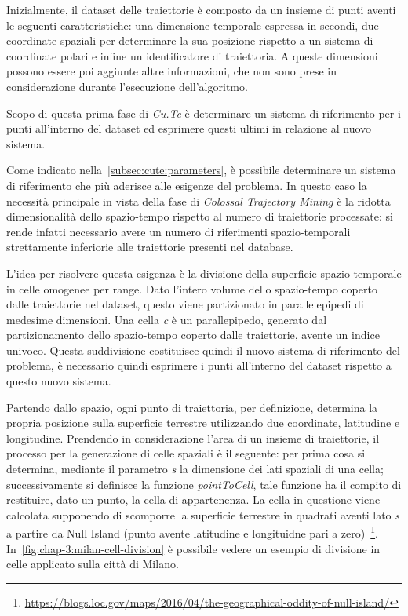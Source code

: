 Inizialmente, il dataset delle traiettorie è composto da un insieme di punti aventi le seguenti caratteristiche:
una dimensione temporale espressa in secondi, due coordinate spaziali per determinare la sua posizione rispetto a un sistema di coordinate polari e
infine un identificatore di traiettoria. A queste dimensioni possono essere poi aggiunte altre informazioni, che non sono prese in considerazione durante l'esecuzione dell'algoritmo.

Scopo di questa prima fase di \textit{Cu.Te} è determinare un sistema di riferimento per i punti all'interno del dataset ed esprimere questi ultimi in
relazione al nuovo sistema.

Come indicato nella~\cref{subsec:cute:parameters}, è possibile determinare un sistema di riferimento che più aderisce alle esigenze del problema.
In questo caso la necessità principale in vista della fase di \textit{Colossal Trajectory Mining} è la ridotta dimensionalità dello spazio-tempo rispetto al numero di traiettorie
processate: si rende infatti necessario avere un numero di riferimenti spazio-temporali strettamente inferiorie alle traiettorie presenti nel database.

L'idea per risolvere questa esigenza è la divisione della superficie spazio-temporale in celle omogenee per range. Dato l'intero volume dello spazio-tempo
coperto dalle traiettorie nel dataset, questo viene partizionato in parallelepipedi di medesime dimensioni. Una cella \textit{c} è un parallepipedo, generato dal
partizionamento dello spazio-tempo coperto dalle traiettorie, avente un indice univoco.
Questa suddivisione costituisce quindi il nuovo sistema di riferimento del problema, è necessario quindi esprimere i punti all'interno del dataset rispetto a questo nuovo sistema.

Partendo dallo spazio, ogni punto di traiettoria, per definizione, determina la propria posizione sulla superficie terrestre utilizzando due coordinate, latitudine e longitudine.
Prendendo in considerazione l'area di un insieme di traiettorie, il processo per la generazione di celle spaziali è il seguente: per prima cosa si determina, mediante
il parametro \textit{s} la dimensione dei lati spaziali di una cella; successivamente si definisce la funzione \textit{pointToCell}, tale funzione ha il compito
di restituire, dato un punto, la cella di appartenenza. La cella in questione viene calcolata supponendo di scomporre la superficie terrestre in quadrati aventi lato \textit{s}
a partire da Null Island (punto avente latitudine e longituidne pari a zero)~\footnote{\url{https://blogs.loc.gov/maps/2016/04/the-geographical-oddity-of-null-island/}}.
In~\cref{fig:chap-3:milan-cell-division} è possibile vedere un esempio di divisione in celle applicato sulla città di Milano.


